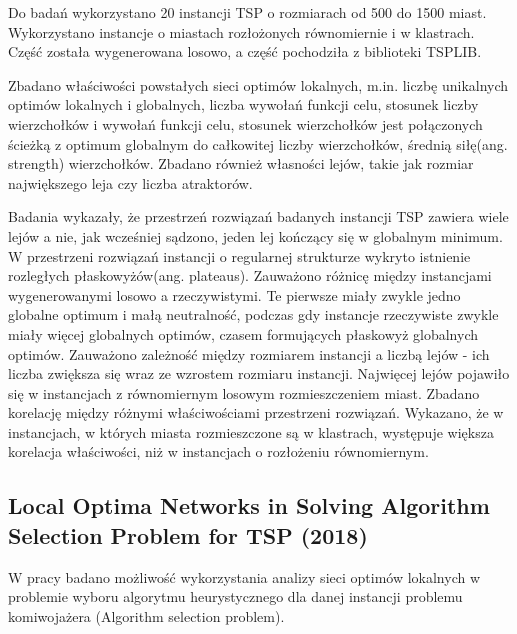 Do badań wykorzystano 20 instancji TSP o rozmiarach od 500 do 1500 miast.
Wykorzystano instancje o miastach rozłożonych równomiernie i w klastrach.
Część została wygenerowana losowo, a część pochodziła z biblioteki TSPLIB.

Zbadano właściwości powstałych sieci optimów lokalnych, m.in. liczbę unikalnych optimów lokalnych i globalnych, liczba wywołań funkcji celu,
stosunek liczby wierzchołków i wywołań funkcji celu, stosunek wierzchołków jest połączonych ścieżką
z optimum globalnym do całkowitej liczby wierzchołków, średnią siłę(ang. strength) wierzchołków.
Zbadano również własności lejów, takie jak rozmiar największego leja czy liczba atraktorów.

Badania wykazały, że przestrzeń rozwiązań badanych instancji TSP zawiera wiele lejów a nie, jak wcześniej sądzono,
jeden lej kończący się w globalnym minimum. W przestrzeni rozwiązań instancji o regularnej strukturze
wykryto istnienie rozległych płaskowyżów(ang. plateaus). Zauważono różnicę między instancjami wygenerowanymi losowo a rzeczywistymi.
Te pierwsze miały zwykle jedno globalne optimum i małą neutralność, podczas gdy instancje rzeczywiste
zwykle miały więcej globalnych optimów, czasem formujących płaskowyż globalnych optimów.
Zauważono zależność między rozmiarem instancji a liczbą lejów - ich liczba zwiększa się wraz ze wzrostem
rozmiaru instancji. Najwięcej lejów pojawiło się w instancjach z równomiernym losowym rozmieszczeniem miast.
Zbadano korelację między różnymi właściwościami przestrzeni rozwiązań.
Wykazano, że w instancjach, w których miasta rozmieszczone są w klastrach, występuje większa korelacja
właściwości, niż w instancjach o rozłożeniu równomiernym.

\subsection*{Local Optima Networks in Solving Algorithm Selection Problem for TSP (2018) \cite{DBLP:conf/depcos/BozejkoGNAB18}}
W pracy badano możliwość wykorzystania analizy sieci optimów lokalnych w problemie wyboru algorytmu heurystycznego dla danej instancji problemu komiwojażera
(Algorithm selection problem).

